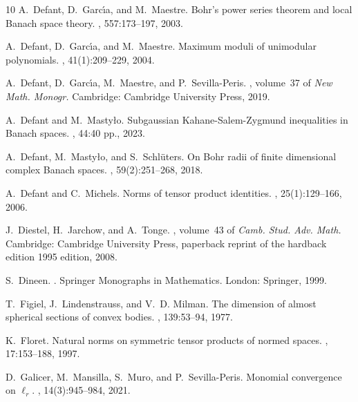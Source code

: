 \documentclass[12pt]{amsart}
\numberwithin{subsection}{section}
\theoremstyle{definition}
\theoremstyle{remark}
\begin{document}
\begin{thebibliography}{10}
A.~Defant, D.~Garc{\'{\i}}a, and M.~Maestre.
\newblock Bohr's power series theorem and local {Banach} space theory.
, 557:173--197, 2003.

A.~Defant, D.~Garc{\'{\i}}a, and M.~Maestre.
\newblock Maximum moduli of unimodular polynomials.
, 41(1):209--229, 2004.

A.~Defant, D.~Garc{\'{\i}}a, M.~Maestre, and P.~Sevilla-Peris.
, volume~37 of {\em New Math. Monogr.}
\newblock Cambridge: Cambridge University Press, 2019.

A.~Defant and M.~Masty{\l}o.
\newblock Subgaussian {K}ahane-{S}alem-{Z}ygmund inequalities in {B}anach spaces.
, 44:40 pp., 2023.

A.~Defant, M.~Masty{\l}o, and S.~Schl{\"u}ters.
\newblock On {Bohr} radii of finite dimensional complex {Banach} spaces.
, 59(2):251--268, 2018.

A.~Defant and C.~Michels.
\newblock Norms of tensor product identities.
, 25(1):129--166, 2006.

J.~Diestel, H.~Jarchow, and A.~Tonge.
, volume~43 of {\em Camb. Stud. Adv. Math.}
\newblock Cambridge: Cambridge University Press, paperback reprint of the hardback edition 1995 edition, 2008.

S.~Dineen.
.
\newblock Springer Monographs in Mathematics. London: Springer, 1999.

T.~Figiel, J.~Lindenstrauss, and V.~D. Milman.
\newblock The dimension of almost spherical sections of convex bodies.
, 139:53--94, 1977.

K.~Floret.
\newblock Natural norms on symmetric tensor products of normed spaces.
, 17:153--188, 1997.

D.~Galicer, M.~Mansilla, S.~Muro, and P.~Sevilla-Peris.
\newblock Monomial convergence on {{\(\ell_r\)}}.
, 14(3):945--984, 2021.


\end{thebibliography}
\end{document}
